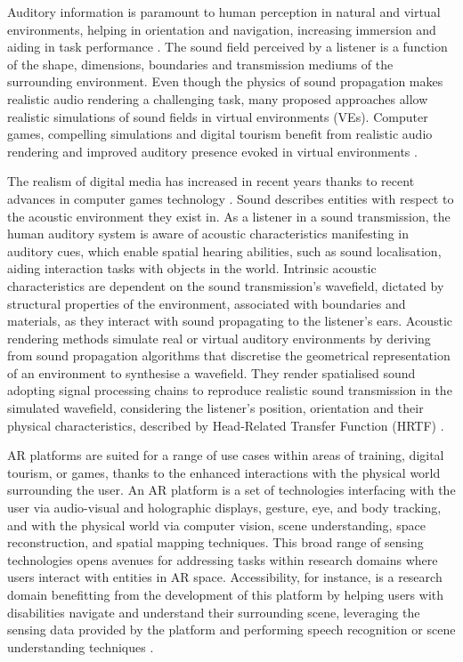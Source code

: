 Auditory information is paramount to human perception in natural and virtual environments, helping in orientation and navigation, increasing immersion and aiding in task performance \citep{lokki2005navigation, bork2015auditory, shivappa2016efficient}. The sound field perceived by a listener is a function of the shape, dimensions, boundaries and transmission mediums of the surrounding environment. Even though the physics of sound propagation makes realistic audio rendering a challenging task, many proposed approaches allow realistic simulations of sound fields in virtual environments (VEs). Computer games, compelling simulations and digital tourism benefit from realistic audio rendering and improved auditory presence evoked in virtual environments \cite{lokki2002creating, selmanovic2020vr, rubio2017immersive}.

The realism of digital media has increased in recent years thanks to recent advances in computer games technology \cite{rubio2017immersive}. Sound describes entities with respect to the acoustic environment they exist in. As a listener in a sound transmission, the human auditory system is aware of acoustic characteristics manifesting in auditory cues, which enable spatial hearing abilities, such as sound localisation, aiding interaction tasks with objects in the world. Intrinsic acoustic characteristics are dependent on the sound transmission's wavefield, dictated by structural properties of the environment, associated with boundaries and materials, as they interact with sound propagating to the listener's ears. Acoustic rendering methods simulate real or virtual auditory environments by deriving from sound propagation algorithms that discretise the geometrical representation of an environment to synthesise a wavefield. They render spatialised sound adopting signal processing chains to reproduce realistic sound transmission in the simulated wavefield, considering the listener's position, orientation and their physical characteristics, described by Head-Related Transfer Function (HRTF) \cite{hulusic2012acoustic}. \par

AR platforms are suited for a range of use cases within areas of training, digital tourism, or games, thanks to the enhanced interactions with the physical world surrounding the user. An AR platform is a set of technologies interfacing with the user via audio-visual and holographic displays, gesture, eye, and body tracking, and with the physical world via computer vision, scene understanding, space reconstruction, and spatial mapping techniques. This broad range of sensing technologies opens avenues for addressing tasks within research domains where users interact with entities in AR space. Accessibility, for instance, is a research domain benefitting from the development of this platform by helping users with disabilities navigate and understand their surrounding scene, leveraging the sensing data provided by the platform and performing speech recognition or scene understanding techniques \citep{mehra2020potential}.


